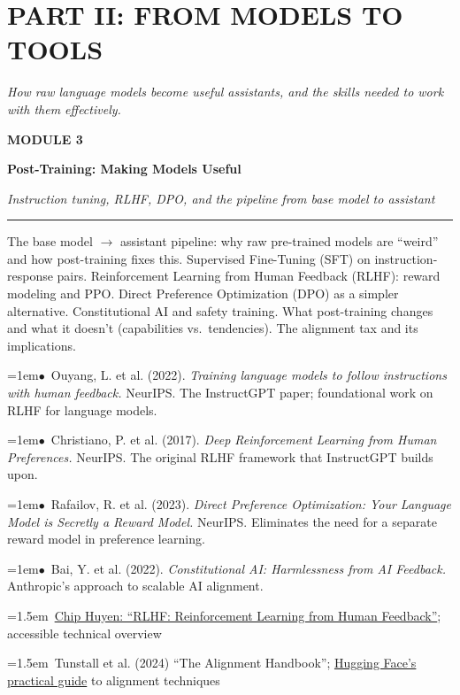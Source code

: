 \documentclass[11pt, a4paper]{article}
\newcommand{\modulehead}[3]{%
  \vspace{0.5em}
  {\small\sffamily\bfseries\textcolor{accent}{MODULE #1}}\par\vspace{-0.3em}
  {\Large\sffamily\bfseries\textcolor{dark}{#2}}\par\vspace{-0.2em}
  {\small\textit{\textcolor{muted}{#3}}}\par
  \vspace{0.2em}\textcolor{bordercol}{\rule{\textwidth}{0.3pt}}\par
}
\newcommand{\seclabel}[1]{%
  \vspace{0.6em}{\normalsize\sffamily\bfseries\textcolor{accent}{#1}}\par\vspace{0.2em}
}
\newcommand{\refpaper}[1]{%
  \par\hangindent=1em\hangafter=1\noindent\textcolor{accent}{\small$\bullet$}~{\small #1}\par
}
\newcommand{\resource}[1]{%
  \par\hangindent=1.5em\hangafter=1\noindent\hspace{0.5em}{\small\textcolor{accent}{\guilsinglright}}~{\small #1}\par
}
\begin{document}
\section{PART II: FROM MODELS TO TOOLS}
{\textit{\textcolor{muted}{How raw language models become useful assistants, and the skills needed to work with them effectively.}}}

\vspace{1em}

\modulehead{3}{Post-Training: Making Models Useful}{Instruction tuning, RLHF, DPO, and the pipeline from base model to assistant}

\seclabel{Core Concepts}

The base model $\rightarrow$ assistant pipeline: why raw pre-trained models are ``weird'' and how post-training fixes this. Supervised Fine-Tuning (SFT) on instruction-response pairs. Reinforcement Learning from Human Feedback (RLHF): reward modeling and PPO. Direct Preference Optimization (DPO) as a simpler alternative. Constitutional AI and safety training. What post-training changes and what it doesn't (capabilities vs.\ tendencies). The alignment tax and its implications.

\seclabel{Core Readings}

\refpaper{Ouyang, L. et al. (2022). \textit{Training language models to follow instructions with human feedback.} NeurIPS. The InstructGPT paper; foundational work on RLHF for language models.}

\refpaper{Christiano, P. et al. (2017). \textit{Deep Reinforcement Learning from Human Preferences.} NeurIPS. The original RLHF framework that InstructGPT builds upon.}

\refpaper{Rafailov, R. et al. (2023). \textit{Direct Preference Optimization: Your Language Model is Secretly a Reward Model.} NeurIPS. Eliminates the need for a separate reward model in preference learning.}

\refpaper{Bai, Y. et al. (2022). \textit{Constitutional AI: Harmlessness from AI Feedback.} Anthropic's approach to scalable AI alignment.}

\seclabel{Further Resources}

\resource{\href{https://huyenchip.com/2023/05/02/rlhf.html}{Chip Huyen: ``RLHF: Reinforcement Learning from Human Feedback''}; accessible technical overview}

\resource{Tunstall et al. (2024) ``The Alignment Handbook''; \href{https://github.com/huggingface/alignment-handbook}{Hugging Face's practical guide} to alignment techniques}
\end{document}

